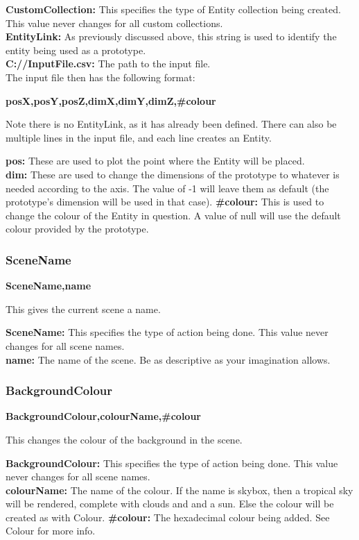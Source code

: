 \documentclass[a4paper,12pt]{article}
\begin{document}
\textbf{CustomCollection:} This specifies the type of Entity collection being created. This value never changes for all custom collections.\\
\textbf{EntityLink:} As previously discussed above, this string is used to identify the entity being used as a prototype.\\
\textbf{C://InputFile.csv:} The path to the input file.\\

The input file then has the following format:

\textbf{posX,posY,posZ,dimX,dimY,dimZ,\#colour}

Note there is no EntityLink, as it has already been defined. There can also be multiple lines in the input file, and each line creates an Entity.

\textbf{pos:} These are used to plot the point where the Entity will be placed.\\
\textbf{dim:} These are used to change the dimensions of the prototype to whatever is needed according to the axis. The value of -1 will leave them as default (the prototype's dimension will be used in that case).
\textbf{\#colour:} This is used to change the colour of the Entity in question. A value of null will use the default colour provided by the prototype.

\subsubsection{SceneName}

\textbf{SceneName,name}

This gives the current scene a name.

\textbf{SceneName:} This specifies the type of action being done. This value never changes for all scene names.\\
\textbf{name:} The name of the scene. Be as descriptive as your imagination allows.

\subsubsection{BackgroundColour}

\textbf{BackgroundColour,colourName,\#colour}

This changes the colour of the background in the scene.

\textbf{BackgroundColour:} This specifies the type of action being done. This value never changes for all scene names.\\
\textbf{colourName:} The name of the colour. If the name is skybox, then a tropical sky will be rendered, complete with clouds and and a sun. Else the colour will be created as with Colour.
\textbf{\#colour:} The hexadecimal colour being added. See Colour for more info.
\end{document}
